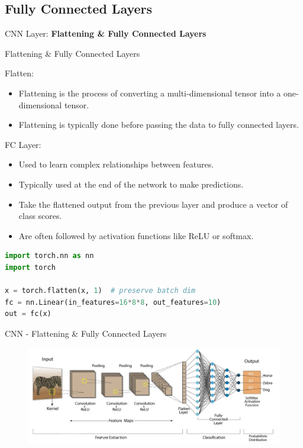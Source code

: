 \subsection{Fully Connected Layers}
\begin{frame}{}
    \LARGE CNN Layer: \textbf{Flattening & Fully Connected Layers}
\end{frame}

\begin{frame}[fragile]{Flattening & Fully Connected Layers}
\begin{block}{Flatten:}
    \begin{itemize}
        \item Flattening is the process of converting a multi-dimensional tensor into a one-dimensional tensor.
        \item Flattening is typically done before passing the data to fully connected layers.
    \end{itemize}
\end{block}

\begin{block}{FC Layer:}
    \begin{itemize}
        \item Used to learn complex relationships between features.
        \item Typically used at the end of the network to make predictions.
        \item Take the flattened output from the previous layer and produce a vector of class scores.
        \item Are often followed by activation functions like ReLU or softmax.
    \end{itemize}
\end{block}

\begin{lstlisting}[language=Python, caption={Code snippet (PyTorch)}, basicstyle=\ttfamily\footnotesize]
import torch.nn as nn
import torch

x = torch.flatten(x, 1)  # preserve batch dim
fc = nn.Linear(in_features=16*8*8, out_features=10)
out = fc(x)
\end{lstlisting}
\end{frame}  

\begin{frame}{CNN - Flattening & Fully Connected Layers}
\begin{figure}
\centering
\includegraphics[width=1.0\textwidth,height=0.9\textheight,keepaspectratio]{images/cnn/cnn-fully-connected.jpeg}
\end{figure}
    
\end{frame}
